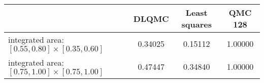 \begin{tabular}{|l|c|c|c|}
\hline
 &DLQMC&Least squares&QMC 128\\ 
\hline

integrated area: $[0.55,0.80]\times [0.35,0.60]$ & 0.34025 & 0.15112 & 1.00000\\ 
\hline
integrated area: $[0.75,1.00]\times [0.75,1.00]$ & 0.47447 & 0.34840 & 1.00000\\ 
\hline
\end{tabular}

